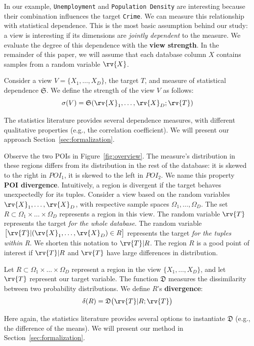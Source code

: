 In our example, \texttt{Unemployment} and \texttt{Population Density} are
interesting because their combination influences the target \texttt{Crime}. We
can measure this relationship with statistical dependence. This is the most
basic assumption behind our study: a view is interesting if its dimensions are
\emph{jointly dependent} to the measure. We evaluate the degree of this
dependence with the \textbf{view strength}. In the remainder of this paper, we
will assume that each database column $X$ contains samples from a random
variable $\rv{X}$.
\begin{definition}
    Consider a view $V = \{X_1, \ldots, X_D\}$, the target $T$, and measure of
    statistical dependence $\mathfrak{S}$.   We
    define the strength of the view $V$ as follows:
    \begin{equation}\label{eq:strengthgen}
        \sigma(V) = \mathfrak{S}(\rv{X}_1, \ldots, \rv{X}_D ; \rv{T})
    \end{equation}
\end{definition}
The statistics literature provides several dependence measures, with different
qualitative properties (e.g., the correlation coefficient). We will present our
approach Section~\ref{sec:formalization}.

Observe the two POIs in Figure~\ref{fig:overview}.  The measure's distribution
in these regions differs from its distribution in the rest of the database: it
is skewed to the right in $POI_1$, it is skewed to the left in $POI_2$. We name
this property \textbf{POI divergence}. Intuitively, a region is divergent if
the target behaves unexpectedly for its tuples.  Consider a view based on the
random variables $\rv{X}_1, \ldots, \rv{X}_D$, with respective sample spaces
$\Omega_1, \ldots, \Omega_D$.  The set $R\subset \Omega_1 \times \ldots \times
\Omega_D$ represents a region in this view.  The random variable $\rv{T}$
represents the target \emph{for the whole database}.  The random variable
$\big[ \rv{T} | (\rv{X}_1, \ldots, \rv{X}_D) \in R \big] $ represents the
target \emph{for the tuples within R}. We shorten this notation to $\rv{T} |
R$. The region $R$ is a good point of interest if $\rv{T} |R $ and $\rv{T}$
have large differences in distribution.
\begin{definition}
    Let $R\subset \Omega_1 \times \ldots \times \Omega_D$ represent a region in
    the view $\{X_1, \ldots, X_D\}$, and let $\rv{T}$ represent our target
    variable. The function $\mathfrak{D}$ measures the dissimilarity between
    two probability distributions. We define $R$'s \textbf{divergence}:
\begin{equation}\label{eq:divergencegen}
    \delta(R) = \mathfrak{D} \big( \rv{T} | R;  \rv{T}\big)
\end{equation}
\end{definition}
Here again, the statistics literature provides several options to instantiate
$\mathfrak{D}$ (e.g., the difference of the means). We will present our method
in Section~\ref{sec:formalization}.

